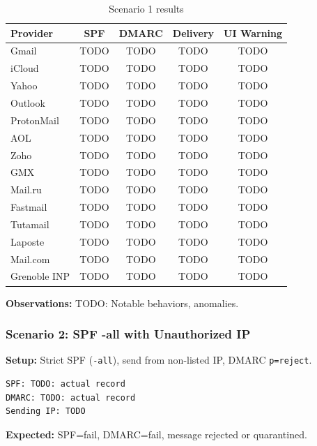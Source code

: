 \documentclass[11pt,a4paper]{article}
\begin{document}
\begin{table}[h]
\centering
\small
\begin{tabular}{lcccc}
\toprule
\textbf{Provider} & \textbf{SPF} & \textbf{DMARC} & \textbf{Delivery} & \textbf{UI Warning} \\
\midrule
Gmail & TODO & TODO & TODO & TODO \\
iCloud & TODO & TODO & TODO & TODO \\
Yahoo & TODO & TODO & TODO & TODO \\
Outlook & TODO & TODO & TODO & TODO \\
ProtonMail & TODO & TODO & TODO & TODO \\
AOL & TODO & TODO & TODO & TODO \\
Zoho & TODO & TODO & TODO & TODO \\
GMX & TODO & TODO & TODO & TODO \\
Mail.ru & TODO & TODO & TODO & TODO \\
Fastmail & TODO & TODO & TODO & TODO \\
Tutamail & TODO & TODO & TODO & TODO \\
Laposte & TODO & TODO & TODO & TODO \\
Mail.com & TODO & TODO & TODO & TODO \\
Grenoble INP & TODO & TODO & TODO & TODO \\
\bottomrule
\end{tabular}
\caption{Scenario 1 results}
\end{table}

\textbf{Observations:} TODO: Notable behaviors, anomalies.


\subsubsection{Scenario 2: SPF -all with Unauthorized IP}

\textbf{Setup:} Strict SPF (\texttt{-all}), send from non-listed IP, DMARC \texttt{p=reject}.

\begin{lstlisting}
SPF: TODO: actual record
DMARC: TODO: actual record
Sending IP: TODO
\end{lstlisting}

\textbf{Expected:} SPF=fail, DMARC=fail, message rejected or quarantined.
\end{document}
